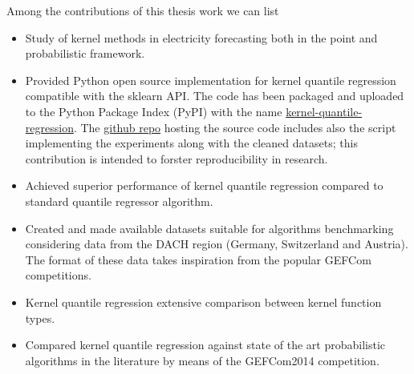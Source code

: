 Among the contributions of this thesis work we can list
\begin{itemize}
    \item Study of kernel methods in electricity forecasting both in the point and probabilistic framework.
    \item Provided Python open source implementation for kernel quantile regression compatible with the sklearn API. The code has been packaged and uploaded to the Python Package Index (PyPI) with the name \href{https://pypi.org/project/kernel-quantile-regression/#2}{kernel-quantile-regression}. The \href{https://github.com/luca-pernigo/kernel_quantile_regression}{github repo} hosting the source code includes also the script implementing the experiments along with the cleaned datasets; this contribution is intended to forster reproducibility in research.
    \item Achieved superior performance of kernel quantile regression compared to standard quantile regressor algorithm. 
    \item Created and made available datasets suitable for algorithms benchmarking considering data from the DACH region (Germany, Switzerland and Austria). The format of these data takes inspiration from the popular GEFCom competitions.
    \item Kernel quantile regression extensive comparison between kernel function types.
    \item Compared kernel quantile regression against state of the art probabilistic algorithms in the literature by means of the GEFCom2014 competition.
\end{itemize}


